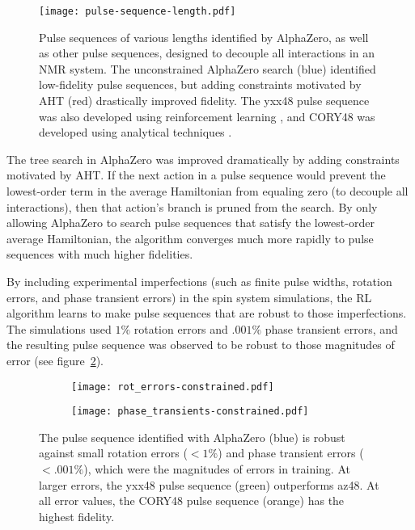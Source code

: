 \documentclass{article}
\begin{document}
\begin{figure}%
    \centering
    \texttt{[image: pulse-sequence-length.pdf]}
    \caption{Pulse sequences of various lengths identified by AlphaZero, as well as other pulse sequences, designed to decouple all interactions in an NMR system. The unconstrained AlphaZero search (blue) identified low-fidelity pulse sequences, but adding constraints motivated by AHT (red) drastically improved fidelity. The yxx48 pulse sequence was also developed using reinforcement learning \cite{peng2021deep}, and CORY48 was developed using analytical techniques \cite{CORY1990205}.}
    \label{fig:fidelity-length}
\end{figure}


The tree search in AlphaZero was improved dramatically by adding constraints motivated by AHT. If the next action in a pulse sequence would prevent the lowest-order term in the average Hamiltonian from equaling zero (to decouple all interactions), then that action's branch is pruned from the search. By only allowing AlphaZero to search pulse sequences that satisfy the lowest-order average Hamiltonian, the algorithm converges much more rapidly to pulse sequences with much higher fidelities.

By including experimental imperfections (such as finite pulse widths, rotation errors, and phase transient errors) in the spin system simulations, the RL algorithm learns to make pulse sequences that are robust to those imperfections. The simulations used $1\%$ rotation errors and $.001\%$ phase transient errors, and the resulting pulse sequence was observed to be robust to those magnitudes of error (see figure~\ref{fig:fidelity-robust}).

\begin{figure}%
    \centering
    \begin{subfigure}{.49\textwidth}
        \centering
        \texttt{[image: rot\_errors-constrained.pdf]}
    \end{subfigure}
    \hfill
    \begin{subfigure}{.49\textwidth}
        \centering
        \texttt{[image: phase\_transients-constrained.pdf]}
    \end{subfigure}
    \caption{The pulse sequence identified with AlphaZero (blue) is robust against small rotation errors ($< 1\%$) and phase transient errors ($< .001\%$), which were the magnitudes of errors in training. At larger errors, the yxx48 pulse sequence (green) outperforms az48. At all error values, the CORY48 pulse sequence (orange) has the highest fidelity.}
    \label{fig:fidelity-robust}
\end{figure}
\end{document}
